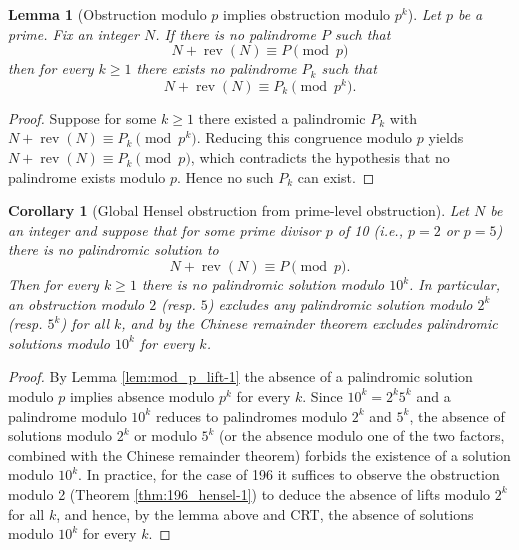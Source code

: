 \documentclass[12pt,a4paper]{article}
\newtheorem{lemma}[theorem]{Lemma}
\newtheorem{corollary}[theorem]{Corollary}
\begin{document}
\begin{lemma}[Obstruction modulo $p$ implies obstruction modulo $p^k$]
Let $p$ be a prime. Fix an integer $N$. If there is no palindrome $P$ such that
$$N+\operatorname{rev}(N)\equiv P\pmod p$$
then for every $k\ge1$ there exists no palindrome $P_k$ such that
$$N+\operatorname{rev}(N)\equiv P_k\pmod{p^k}.$$
\end{lemma}

\begin{proof}
Suppose for some $k\ge1$ there existed a palindromic $P_k$ with
$N+\operatorname{rev}(N)\equiv P_k\pmod{p^k}$. Reducing this congruence modulo $p$ yields
$N+\operatorname{rev}(N)\equiv P_k\pmod p$, which contradicts the hypothesis that no palindrome exists modulo $p$. Hence no such $P_k$ can exist.
\end{proof}

\begin{corollary}[Global Hensel obstruction from prime-level obstruction]%
Let $N$ be an integer and suppose that for some prime divisor $p$ of 10 (i.e., $p=2$ or $p=5$) there is no palindromic solution to
$$N+\operatorname{rev}(N)\equiv P\pmod p.$$ Then for every $k\ge1$ there is no palindromic solution modulo $10^k$. In particular, an obstruction modulo $2$ (resp. $5$) excludes any palindromic solution modulo $2^k$ (resp. $5^k$) for all $k$, and by the Chinese remainder theorem excludes palindromic solutions modulo $10^k$ for every $k$.
\end{corollary}

\begin{proof}
By Lemma \ref{lem:mod_p_lift-1} the absence of a palindromic solution modulo $p$ implies absence modulo $p^k$ for every $k$. Since $10^k=2^k5^k$ and a palindrome modulo $10^k$ reduces to palindromes modulo $2^k$ and $5^k$, the absence of solutions modulo $2^k$ or modulo $5^k$ (or the absence modulo one of the two factors, combined with the Chinese remainder theorem) forbids the existence of a solution modulo $10^k$. In practice, for the case of 196 it suffices to observe the obstruction modulo 2 (Theorem \ref{thm:196_hensel-1}) to deduce the absence of lifts modulo $2^k$ for all $k$, and hence, by the lemma above and CRT, the absence of solutions modulo $10^k$ for every $k$.
\end{proof}
\end{document}
